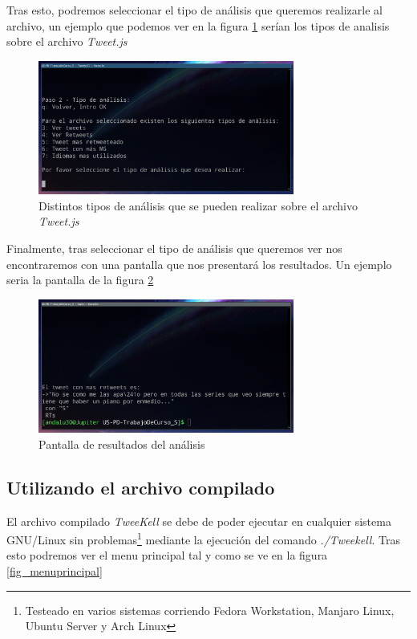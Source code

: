\documentclass[11pt]{article}
\begin{document}
Tras esto, podremos seleccionar el tipo de análisis que queremos realizarle al archivo, un ejemplo que podemos ver en la figura \ref{fig_tipoAnalisis} serían los tipos de analisis sobre el archivo \textit{Tweet.js}

\begin{figure}[h]
    \centering
    \includegraphics[width=0.75\textwidth]{tiposanalisis.png}
    \caption{Distintos tipos de análisis que se pueden realizar sobre el archivo \textit{Tweet.js}}
    \label{fig_tipoAnalisis}
\end{figure}
\medskip

Finalmente, tras seleccionar el tipo de análisis que queremos ver nos encontraremos con una pantalla que nos presentará los resultados. Un ejemplo seria la pantalla de la figura \ref{fig_resultados}

\begin{figure}[h]
    \centering
    \includegraphics[width=0.75\textwidth]{analisisdone.png}
    \caption{Pantalla de resultados del análisis}
    \label{fig_resultados}
\end{figure}



\subsection{Utilizando el archivo compilado}
El archivo compilado \textit{TweeKell} se debe de poder ejecutar en cualquier sistema GNU/Linux sin problemas\footnote{Testeado en varios sistemas corriendo Fedora Workstation, Manjaro Linux, Ubuntu Server y Arch Linux} mediante la ejecución del comando \textit{./Tweekell}. Tras esto podremos ver el menu principal tal y como se ve en la figura \ref{fig_menuprincipal}
\end{document}
